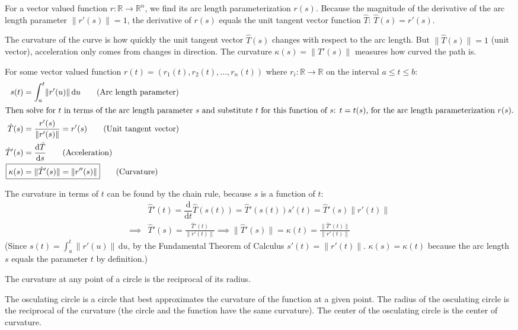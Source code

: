 \documentclass{article}
\newcommand*{\deriv}[1][x]{\ensuremath{\dfrac{\mathrm{d}}{\mathrm{d}#1}}}
\begin{document}
For a vector valued function $r:\mathbb R\to\mathbb R^n$, we find its arc length parameterization $r(s)$. Because the magnitude of the derivative of the arc length parameter $\lVert r'(s) \rVert =1$, the derivative of $r(s)$ equals the unit tangent vector function $\hat T$: $\hat T(s)=r'(s)$.

The curvature of the curve is how quickly the unit tangent vector $\hat T(s)$ changes with respect to the arc length. But $\lVert \hat T(s) \rVert =1$ (unit vector), acceleration only comes from changes in direction. The curvature $\kappa(s)=\lVert T'(s) \rVert $ measures how curved the path is.

For some vector valued function $r(t)=(r_1(t),r_2(t),\ldots,r_n(t))$ where $r_i:\mathbb R \to \mathbb R$ on the interval $a\leq t\leq b$:
\begin{align*}
	s(t)&=\int_{a}^{t}\lVert r'(u) \rVert \,\mathrm{d}u
	\tag{Arc length parameter} \\
	\intertext{Then solve for $t$ in terms of the arc length parameter $s$ and substitute $t$ for this function of $s$: $t=t(s)$, for the arc length parameterization $r(s)$.}
	\hat T(s)&=\frac{r'(s)}{\lVert r'(s) \rVert }=r'(s) \tag{Unit tangent vector} \\
	\hat T'(s)&=\diff{\hat T}{s} \tag{Acceleration} \\
	\Aboxed{\kappa(s)&=\lVert \hat T'(s) \rVert=\lVert r''(s) \rVert  } \tag{Curvature}
\end{align*}

The curvature in terms of $t$ can be found by the chain rule, because $s$ is a function of $t$:
\begin{align*}
	&\hat T'(t)
	=\deriv[t]\hat T(s(t))
	=\hat T'(s(t)) s'(t)
	=\hat T'(s) \lVert r'(t) \rVert  \\
	\implies{}&
	\hat T'(s)
	= \frac{\hat T'(t)}{\lVert r'(t) \rVert }
	\implies 
	\lVert \hat T'(s) \rVert 
	=\boxed{\kappa(t)= \frac{\lVert \hat T'(t) \rVert}{\lVert r'(t) \rVert }}
\end{align*}
(Since $s(t)=\int_{a}^{t}\lVert r'(u) \rVert \,\mathrm{d}u$, by the Fundamental Theorem of Calculus $s'(t)=\lVert r'(t) \rVert $. $\kappa(s)=\kappa(t)$ because the arc length $s$ equals the parameter $t$ by definition.)

The curvature at any point of a circle is the reciprocal of its radius.

The osculating circle is a circle that best approximates the curvature of the function at a given point. The radius of the osculating circle is the reciprocal of the curvature (the circle and the function have the same curvature). The center of the osculating circle is the center of curvature.
\end{document}
